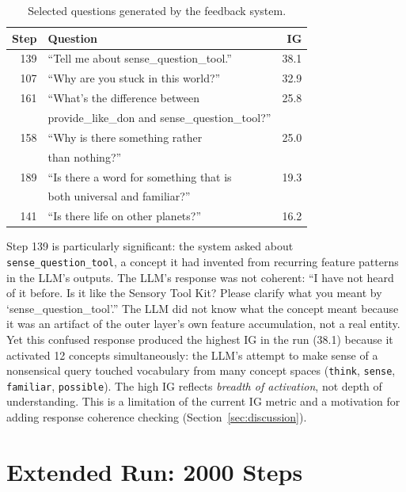 \documentclass[conference]{IEEEtran}
\begin{document}
\begin{table}[!htbp]
\centering
\caption{Selected questions generated by the feedback system.}
\begin{tabular}{rlr}
\toprule
\textbf{Step} & \textbf{Question} & \textbf{IG} \\
\midrule
139 & ``Tell me about sense\_question\_tool.'' & 38.1 \\
107 & ``Why are you stuck in this world?'' & 32.9 \\
161 & ``What's the difference between & 25.8 \\
    & provide\_like\_don and sense\_question\_tool?'' & \\
158 & ``Why is there something rather & 25.0 \\
    & than nothing?'' & \\
189 & ``Is there a word for something that is & 19.3 \\
    & both universal and familiar?'' & \\
141 & ``Is there life on other planets?'' & 16.2 \\
\bottomrule
\end{tabular}
\label{tab:questions}
\end{table}

Step 139 is particularly significant: the system asked about \texttt{sense\_question\_tool}, a concept it had invented from recurring feature patterns in the LLM's outputs. The LLM's response was not coherent: ``I have not heard of it before. Is it like the Sensory Tool Kit? Please clarify what you meant by `sense\_question\_tool'.'' The LLM did not know what the concept meant because it was an artifact of the outer layer's own feature accumulation, not a real entity. Yet this confused response produced the highest IG in the run (38.1) because it activated 12 concepts simultaneously: the LLM's attempt to make sense of a nonsensical query touched vocabulary from many concept spaces (\texttt{think}, \texttt{sense}, \texttt{familiar}, \texttt{possible}). The high IG reflects \emph{breadth of activation}, not depth of understanding. This is a limitation of the current IG metric and a motivation for adding response coherence checking (Section~\ref{sec:discussion}).


\section{Extended Run: 2000 Steps}
\label{sec:extended}
\end{document}
